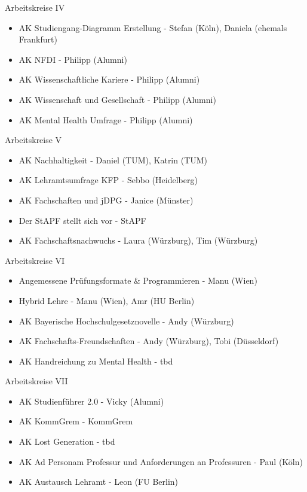 \begin{frame}{Arbeitskreise IV}
	\begin{itemize}
		\item AK Studiengang-Diagramm Erstellung - Stefan (Köln), Daniela (ehemals Frankfurt)
		\item AK NFDI - Philipp (Alumni)
		\item AK Wissenschaftliche Kariere - Philipp (Alumni)
		\item AK Wissenschaft und Gesellschaft - Philipp (Alumni)
		\item AK Mental Health Umfrage - Philipp (Alumni)
	\end{itemize}
\end{frame}

\begin{frame}{Arbeitskreise V}
	\begin{itemize}
		\item AK Nachhaltigkeit - Daniel (TUM), Katrin (TUM)	
		\item AK Lehramtsumfrage KFP - Sebbo (Heidelberg)
		\item AK Fachschaften und jDPG - Janice (Münster)
		\item Der StAPF stellt sich vor - StAPF
		\item AK Fachschaftsnachwuchs - Laura (Würzburg), Tim (Würzburg) 
	\end{itemize}
\end{frame}

\begin{frame}{Arbeitskreise VI}
	\begin{itemize}
		\item Angemessene Prüfungsformate \& Programmieren - Manu (Wien) 
		\item Hybrid Lehre - Manu (Wien), Amr (HU Berlin)
		\item AK Bayerische Hochschulgesetznovelle - Andy (Würzburg) 
		\item AK Fachschafts-Freundschaften - Andy (Würzburg), Tobi (Düsseldorf)
		\item AK Handreichung zu Mental Health - tbd 
	\end{itemize}
\end{frame}

\begin{frame}{Arbeitskreise VII}
	\begin{itemize}
		\item AK Studienführer 2.0 - Vicky (Alumni) 
		\item AK KommGrem - KommGrem 
		\item AK Lost Generation - tbd
		\item AK Ad Personam Professur und Anforderungen an Professuren - Paul (Köln)
		\item AK Austausch Lehramt - Leon (FU Berlin)
	\end{itemize}
\end{frame}

